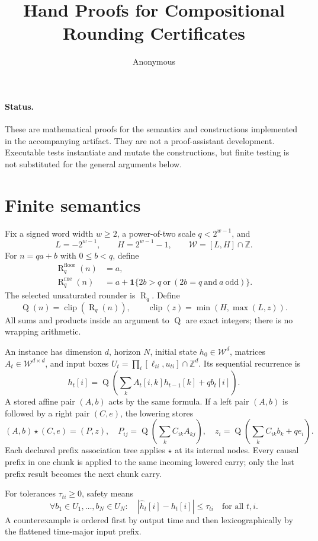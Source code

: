 \documentclass[11pt]{article}
\title{Hand Proofs for Compositional Rounding Certificates}
\author{Anonymous}
\date{}
\newcommand{\Z}{\mathbb Z}
\newcommand{\W}{\mathcal W}
\newcommand{\clip}{\operatorname{clip}}
\newcommand{\R}{\operatorname{R}}
\newcommand{\Q}{\operatorname{Q}}
\begin{document}
\maketitle

\paragraph{Status.}
These are mathematical proofs for the semantics and constructions implemented in the accompanying artifact. They are not a proof-assistant development. Executable tests instantiate and mutate the constructions, but finite testing is not substituted for the general arguments below.

\section{Finite semantics}
Fix a signed word width $w\ge 2$, a power-of-two scale $q<2^{w-1}$, and
\[
  L=-2^{w-1},\qquad H=2^{w-1}-1,\qquad \W=[L,H]\cap\Z.
\]
For $n=qa+b$ with $0\le b<q$, define
\begin{align*}
 \R_q^{\mathrm{floor}}(n)&=a,\\
 \R_q^{\mathrm{rne}}(n)&=a+
  \mathbf 1\{2b>q\ \text{or}\ (2b=q\ \text{and}\ a\ \text{odd})\}.
\end{align*}
The selected unsaturated rounder is $\R_q$. Define
\[
  \Q(n)=\clip(\R_q(n)),\qquad
  \clip(z)=\min(H,\max(L,z)).
\]
All sums and products inside an argument to $\Q$ are exact integers; there is no wrapping arithmetic.

An instance has dimension $d$, horizon $N$, initial state $h_0\in\W^d$, matrices $A_t\in\W^{d\times d}$, and input boxes $U_t=\prod_i[\ell_{ti},u_{ti}]\cap\Z^d$. Its sequential recurrence is
\[
  h_t[i]=\Q\!\left(\sum_k A_t[i,k]h_{t-1}[k]+q b_t[i]\right).
\]
A stored affine pair $(A,b)$ acts by the same formula. If a left pair $(A,b)$ is followed by a right pair $(C,e)$, the lowering stores
\[
 (A,b)\star(C,e)=(P,z),\quad
 P_{ij}=\Q\!\left(\sum_k C_{ik}A_{kj}\right),\quad
 z_i=\Q\!\left(\sum_k C_{ik}b_k+q e_i\right).
\]
Each declared prefix association tree applies $\star$ at its internal nodes. Every causal prefix in one chunk is applied to the same incoming lowered carry; only the last prefix result becomes the next chunk carry.

For tolerances $\tau_{ti}\ge0$, safety means
\[
 \forall b_1\in U_1,\ldots,b_N\in U_N:\quad
   |\widehat h_t[i]-h_t[i]|\le\tau_{ti}\quad\text{for all }t,i.
\]
A counterexample is ordered first by output time and then lexicographically by the flattened time-major input prefix.
\end{document}
